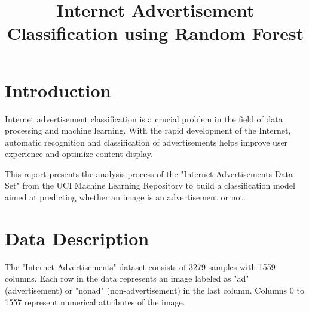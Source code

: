 \documentclass[twoside,final]{hcmut-report}
\title{Internet Advertisement Classification using Random Forest}
\begin{document}
\coverpage%


\tableofcontents
\listoffigures
\listoftables
\lstlistoflistings{}

\clearpage

\section{Introduction}
\label{sec:introduction}

Internet advertisement classification is a crucial problem in the field of data processing and machine learning. With the rapid development of the Internet, automatic recognition and classification of advertisements helps improve user experience and optimize content display.

This report presents the analysis process of the "Internet Advertisements Data Set" from the UCI Machine Learning Repository \cite{lichman2013uci} to build a classification model aimed at predicting whether an image is an advertisement or not.

\section{Data Description}
\label{sec:data-description}

The "Internet Advertisements" dataset consists of 3279 samples with 1559 columns. Each row in the data represents an image labeled as "ad" (advertisement) or "nonad" (non-advertisement) in the last column. Columns 0 to 1557 represent numerical attributes of the image.
\end{document}
